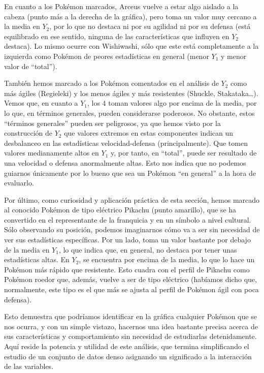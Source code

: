 \documentclass[
  11.8pt,
]{extreport}
\begin{document}
En cuanto a los Pokémon marcados, Arceus vuelve a estar algo aislado a
la cabeza (punto más a la derecha de la gráfica), pero toma un valor muy
cercano a la media en \(Y_2\), por lo que no destaca ni por su agilidad
ni por su defensa (está equilibrado en ese sentido, ninguna de las
características que influyen en \(Y_2\) destaca). Lo mismo ocurre con
Wishiwashi, sólo que este está completamente a la izquierda como Pokémon
de peores estadísticas en general (menor \(Y_1\) y menor valor de
``total'').

También hemos marcado a los Pokémon comentados en el análisis de \(Y_2\)
como más ágiles (Regieleki) y los menos ágiles y más resistentes
(Shuckle, Stakataka\ldots). Vemos que, en cuanto a \(Y_1\), los 4 toman
valores algo por encima de la media, por lo que, en términos generales,
pueden considerarse poderosos. No obstante, estos ``términos generales''
pueden ser peligrosos, ya que hemos visto por la construcción de \(Y_2\)
que valores extremos en estas componentes indican un desbalanceo en las
estadísticas velocidad-defensa (principalmente). Que tomen valores
medianamente altos en \(Y_1\) y, por tanto, en ``total'', puede ser
resultado de una velocidad o defensa anormalmente altas. Esto nos indica
que no podemos guiarnos únicamente por lo bueno que sea un Pokémon ``en
general'' a la hora de evaluarlo.

Por último, como curiosidad y aplicación práctica de esta sección, hemos
marcado al conocido Pokémon de tipo eléctrico Pikachu (punto amarillo),
que se ha convertido en el representante de la franquicia y en un
símbolo a nivel cultural. Sólo observando su posición, podemos
imaginarnos cómo va a ser sin necesidad de ver sus estadísticas
específicas. Por un lado, toma un valor bastante por debajo de la media
en \(Y_1\), lo que indica que, en general, no destaca por tener unas
estadísticas altas. En \(Y_2\), se encuentra por encima de la media, lo
que lo hace un Pokémon más rápido que resistente. Esto cuadra con el
perfil de Pikachu como Pokémon roedor que, además, vuelve a ser de tipo
eléctrico (habíamos dicho que, normalmente, este tipo es el que más se
ajusta al perfil de Pokémon ágil con poca defensa).

Esto demuestra que podríamos identificar en la gráfica cualquier Pokémon
que se nos ocurra, y con un simple vistazo, hacernos una idea bastante
precisa acerca de sus características y comportamiento sin necesidad de
estudiarlas detenidamente. Aquí reside la potencia y utilidad de este
análisis, que termina simplificando el estudio de un conjunto de datos
denso asignando un significado a la interacción de las variables.
\end{document}
